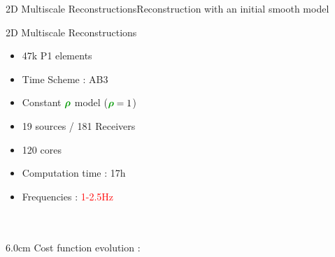 \begin{frame}[noframenumbering]{2D Multiscale Reconstructions}{Reconstruction with an initial smooth model}
  \vspace{-0.5cm}
  \renewcommand{\modelfile}{fig/marmousi_filter_5}
  \renewcommand{\modeltitle}{Reconstructed $\velocity$ Model with \textcolor{red}{1.0-15Hz} filter}
  \begin{figure}
        \hfill
  \end{figure}
  \vspace{-1cm}
  \renewcommand{\modeltitle}{Target $\velocity$ Model}
  \renewcommand{\modelfile}{fig/marmousi_target}
  \begin{figure}
        \hfill
   \end{figure}
\end{frame}




\begin{frame}{2D Multiscale Reconstructions}

  \begin{multicols}{2}
    \begin{itemize}
    \item 47k P1 elements
    \item Time Scheme : AB3
    \item Constant $\density$ model ($\density=1$)
    \item 19 sources / 181 Receivers
    \item 120 cores
    \item Computation time : 17h
    \item Frequencies : \textcolor{red}{1-2.5Hz} \\ ~ \\ ~
    \end{itemize}
    \columnbreak

    \setlength{\plotwidth} {6.0cm}
    \setlength{\plotheight}{5cm}
    Cost function evolution :
    \begin{figure}
    \end{figure}
  \end{multicols}
\end{frame}

